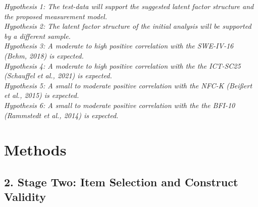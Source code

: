 \documentclass[
  12pt,
  a4paper,
  twoside]{article}
\begin{document}
\emph{Hypothesis 1: The test-data will support the suggested latent factor structure and the proposed measurement model.}\\
\emph{Hypothesis 2: The latent factor structure of the initial analysis will be supported by a different sample.}\\
\emph{Hypothesis 3: A moderate to high positive correlation with the SWE-IV-16 (Behm, 2018) is expected.}\\
\emph{Hypothesis 4: A moderate to high positive correlation with the the ICT-SC25 (Schauffel et al., 2021) is expected.}\\
\emph{Hypothesis 5: A small to moderate positive correlation with the NFC-K (Beißert et al., 2015) is expected.}\\
\emph{Hypothesis 6: A small to moderate positive correlation with the the BFI-10 (Rammstedt et al., 2014) is expected.}

\section{Methods}\label{methods}

\subsection{2. Stage Two: Item Selection and Construct Validity}\label{stage-two-item-selection-and-construct-validity}
\end{document}
